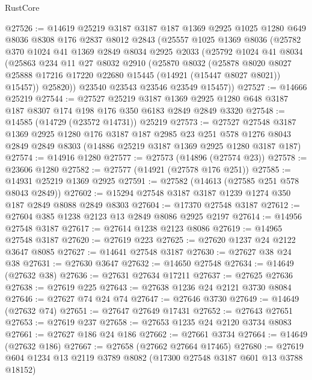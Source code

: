 \begin{lexlean}{RustCore}
\begin{coremodule}
@27526 := @14619
    @25219
    @3187
    @3187
    @187
    @1369
    @2925
    @1025
    @1280
    @649
    @8036
    @8308
    @176
    @2837
    @8012
    @2843
    (@25557
      @1025
      @1369
      @8036
      (@25782
        @370
        @1024
        @41
        @1369
        @2849
        @8034
        @2925
        @2033
        (@25792
          @1024
          @41
          @8034
          (@25863
            @234
            @11
            @27
            @8032
            @2910
            (@25870
              @8032
              (@25878
                @8020
                @8027
                @25888
                @17216
                @17220
                @22680
                @15445
                (@14921 (@15447 @8027 @8021))
                @15457))
            @25820))
        @23540
        @23543
        @23546
        @23549
        @15457))
@27527 := @14666 @25219
@27544 := @27527
    @25219
    @3187
    @1369
    @2925
    @1280
    @648
    @3187
    @187
    @8307
    @174
    @198
    @176
    @350
    @6183
    @2849
    @2849
    @3320
@27548 := @14585 (@14729 (@23572 @14731)) @25219
@27573 := @27527
    @27548
    @3187
    @1369
    @2925
    @1280
    @176
    @3187
    @187
    @2985
    @23
    @251
    @578
    @1276
    @8043
    @2849
    @2849
    @8303
    (@14886 @25219 @3187 @1369 @2925 @1280 @3187 @187)
@27574 := @14916 @1280
@27577 := @27573 (@14896 (@27574 @23))
@27578 := @23606 @1280
@27582 := @27577 (@14921 (@27578 @176 @251))
@27585 := @14931 @25219 @1369 @2925
@27591 := @27582 (@14613 (@27585 @251 @578 @8043 @2849))
@27602 := @15294 @27548 @3187 @3187 @1239 @1274 @350 @187 @2849 @8088 @2849 @8303
@27604 := @17370 @27548 @3187
@27612 := @27604 @385 @1238 @2123 @13 @2849 @8086 @2925 @2197
@27614 := @14956 @27548 @3187
@27617 := @27614 @1238 @2123 @8086
@27619 := @14965 @27548 @3187
@27620 := @27619 @223
@27625 := @27620 @1237 @24 @2122 @3647 @8085
@27627 := @14641 @27548 @3187
@27630 := @27627 @38 @24 @38
@27631 := @27630 @3647
@27632 := @14650 @27548
@27634 := @14649 (@27632 @38)
@27636 := @27631 @27634 @17211
@27637 := @27625 @27636
@27638 := @27619 @225
@27643 := @27638 @1236 @24 @2121 @3730 @8084
@27646 := @27627 @74 @24 @74
@27647 := @27646 @3730
@27649 := @14649 (@27632 @74)
@27651 := @27647 @27649 @17431
@27652 := @27643 @27651
@27653 := @27619 @237
@27658 := @27653 @1235 @24 @2120 @3734 @8083
@27661 := @27627 @186 @24 @186
@27662 := @27661 @3734
@27664 := @14649 (@27632 @186)
@27667 := @27658 (@27662 @27664 @17465)
@27680 := @27619 @604 @1234 @13 @2119 @3789 @8082 (@17300 @27548 @3187 @601 @13 @3788 @18152)

\end{coremodule}
\end{lexlean}
